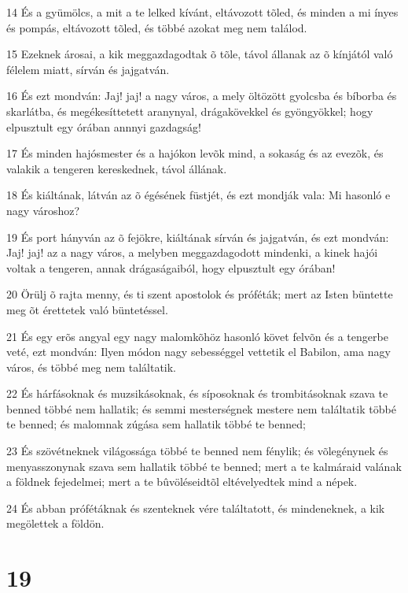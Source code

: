 \par 14 És a gyümölcs, a mit a te lelked kívánt, eltávozott tõled, és minden a mi ínyes és pompás, eltávozott tõled, és többé azokat meg nem találod.
\par 15 Ezeknek árosai, a kik meggazdagodtak õ tõle, távol állanak az õ kínjától való félelem miatt, sírván és jajgatván.
\par 16 És ezt mondván: Jaj! jaj! a nagy város, a mely öltözött gyolcsba és bíborba és skarlátba, és megékesíttetett aranynyal, drágakövekkel és gyöngyökkel; hogy elpusztult egy órában annnyi gazdagság!
\par 17 És minden hajósmester és a hajókon levõk mind, a sokaság és az evezõk, és valakik a tengeren kereskednek, távol állának.
\par 18 És kiáltának, látván az õ égésének füstjét, és ezt mondják vala: Mi hasonló e nagy városhoz?
\par 19 És port hányván az õ fejökre, kiáltának sírván és jajgatván, és ezt mondván: Jaj! jaj! az a nagy város, a melyben meggazdagodott mindenki, a kinek hajói voltak a tengeren, annak drágaságaiból, hogy elpusztult egy órában!
\par 20 Örülj õ rajta menny, és ti szent apostolok és próféták; mert az Isten büntette meg õt érettetek való büntetéssel.
\par 21 És egy erõs angyal egy nagy malomkõhöz hasonló követ felvõn és a tengerbe veté, ezt mondván: Ilyen módon nagy sebességgel vettetik el Babilon, ama nagy város, és többé meg nem találtatik.
\par 22 És hárfásoknak és muzsikásoknak, és síposoknak és trombitásoknak szava te benned többé nem hallatik; és semmi mesterségnek mestere nem találtatik többé te benned; és malomnak zúgása sem hallatik többé te benned;
\par 23 És szövétneknek világossága többé te benned nem fénylik; és võlegénynek és menyasszonynak szava sem hallatik többé te benned; mert a te kalmáraid  valának a földnek fejedelmei; mert a te bûvöléseidtõl eltévelyedtek mind a népek.
\par 24 És abban prófétáknak és szenteknek vére találtatott, és mindeneknek, a kik megölettek a földön.

\chapter{19}


